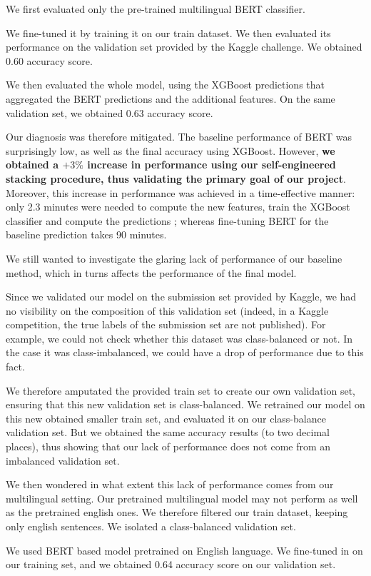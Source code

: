 \documentclass[final]{cvpr}
\begin{document}
We first evaluated only the pre-trained multilingual BERT classifier. 

We fine-tuned it by training it on our train dataset. We then evaluated its performance on the validation set provided by the Kaggle challenge. We obtained 0.60 accuracy score.

We then evaluated the whole model, using the XGBoost predictions that aggregated the BERT predictions and the additional features. On the same validation set, we obtained 0.63 accuracy score.

Our diagnosis was therefore mitigated. The baseline performance of BERT was surprisingly low, as well as the final accuracy using XGBoost. However, \textbf{we obtained a $+3\%$ increase in performance using our self-engineered stacking procedure, thus validating the primary goal of our project}. Moreover, this increase in performance was achieved in a time-effective manner: only 2.3 minutes were needed to compute the new features, train the XGBoost classifier and compute the predictions ; whereas fine-tuning BERT for the baseline prediction takes 90 minutes.

We still wanted to investigate the glaring lack of performance of our baseline method, which in turns affects the performance of the final model. 

Since we validated our model on the submission set provided by Kaggle, we had no visibility on the composition of this validation set (indeed, in a Kaggle competition, the true labels of the submission set are not published). For example, we could not check whether this dataset was class-balanced or not. In the case it was class-imbalanced, we could have a drop of performance due to this fact.

We therefore amputated the provided train set to create our own validation set, ensuring that this new validation set is class-balanced. We retrained our model on this new obtained smaller train set, and evaluated it on our class-balance validation set. But we obtained the same accuracy results (to two decimal places), thus showing that our lack of performance does not come from an imbalanced validation set.

We then wondered in what extent this lack of performance comes from our multilingual setting. Our pretrained multilingual model may not perform as well as the pretrained english ones. We therefore filtered our train dataset, keeping only english sentences. We isolated a class-balanced validation set.

We used BERT based model pretrained on English language. We fine-tuned in on our training set, and we obtained 0.64 accuracy score on our validation set.
\end{document}
